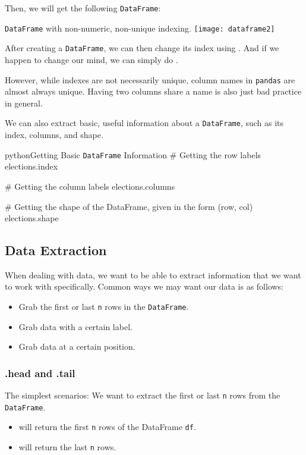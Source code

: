 \documentclass[openany]{book}
\begin{document}
Then, we will get the following \texttt{DataFrame}:
\begin{figurebox}{\texttt{DataFrame} with non-numeric, non-unique indexing.}
	\centering\texttt{[image: dataframe2]}
\end{figurebox}

After creating a \texttt{DataFrame}, we can then change its index using . And if we happen to change our mind, we can simply do .

However, while indexes are not necessarily unique, column names in \texttt{pandas} are almost always unique. Having two columns share a name is also just bad practice in general.

We can also extract basic, useful information about a \texttt{DataFrame}, such as its index, columns, and shape.

\begin{code}{python}{Getting Basic \texttt{DataFrame} Information}
# Getting the row labels
elections.index

# Getting the column labels
elections.columns

# Getting the shape of the DataFrame, given in the form (row, col)
elections.shape
\end{code}

\subsection{Data Extraction}
When dealing with data, we want to be able to extract information that we want to work with specifically. Common ways we may want our data is as follows:
\begin{itemize}
	\item Grab the first or last \texttt{n} rows in the \texttt{DataFrame}.
	\item Grab data with a certain label.
	\item Grab data at a certain position. 
\end{itemize}

\subsubsection{.head and .tail}
The simplest scenarios: We want to extract the first or last \texttt{n} rows from the \texttt{DataFrame}.
\begin{itemize}
	\item {} will return the first \texttt{n} rows of the DataFrame \texttt{df}.
	\item {} will return the last \texttt{n} rows.
\end{itemize}
\end{document}
